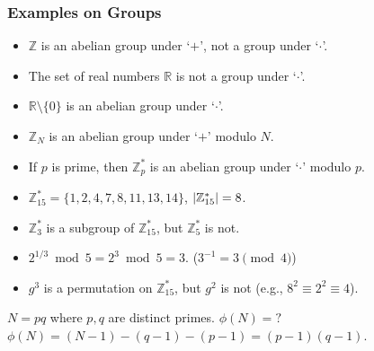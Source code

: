\begin{frame}\frametitle{Examples on Groups}
\begin{exampleblock}{}
\begin{itemize}
\item $\mathbb{Z}$ is an abelian group under `$+$', not a group under `$\cdot$'.
\item The set of real numbers $\mathbb{R}$ is not a group under `$\cdot$'.
\item $\mathbb{R}\setminus \{0\}$ is an abelian group under `$\cdot$'.
\item $\mathbb{Z}_N$ is an abelian group under `$+$' modulo $N$.
\item If $p$ is prime, then $\mathbb{Z}_p^*$ is an abelian group under `$\cdot$' modulo $p$. 
\item $\mathbb{Z}_{15}^*= \{1,2,4,7,8,11,13,14\}$, $\lvert\mathbb{Z}_{15}^*\rvert=8$.
\item $\mathbb{Z}_{3}^*$ is a subgroup of $\mathbb{Z}_{15}^*$, but $\mathbb{Z}_{5}^*$ is not.
\item $2^{1/3} \bmod 5 = 2^{3} \bmod 5 = 3$. ($3^{-1} = 3 \pmod 4$)
\item $g^3$ is a permutation on $\mathbb{Z}_{15}^*$, but $g^2$ is not (e.g., $8^2 \equiv 2^2\equiv 4$). 
\end{itemize}
\end{exampleblock}
\begin{exampleblock}{$N=pq$ where $p,q$ are distinct primes. $\phi(N)=?$}
$\phi(N)=(N-1)-(q-1)-(p-1)=(p-1)(q-1)$.
\end{exampleblock}
\end{frame}
